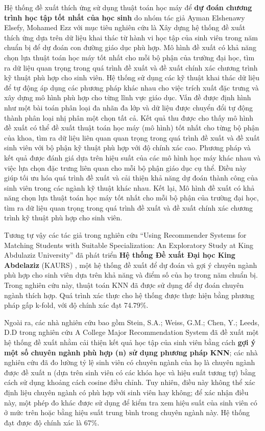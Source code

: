 Hệ thống đề xuất thích ứng sử dụng thuật toán học máy để \textbf{dự đoán chương trình học tập tốt nhất của học sinh} do nhóm tác giả Ayman Elshenawy Elsefy, Mohamed Ezz \cite{mohamed} với mục tiêu nghiên cứu là Xây dựng hệ thống đề xuất thích ứng dựa trên dữ liệu khai thác từ hành vi học tập của sinh viên trong năm chuẩn bị để dự đoán con đường giáo dục phù hợp. Mô hình đề xuất có khả năng chọn lựa thuật toán học máy tốt nhất cho mỗi bộ phận của trường đại học, tìm ra dữ liệu quan trọng trong quá trình đề xuất và đề xuất chính xác chương trình kỹ thuật phù hợp cho sinh viên. Hệ thống sử dụng các kỹ thuật khai thác dữ liệu để tự động áp dụng các phương pháp khác nhau cho việc trích xuất đặc trưng và xây dựng mô hình phù hợp cho từng lĩnh vực giáo dục. Vấn đề được định hình như một bài toán phân loại đa nhãn đa lớp và dữ liệu được chuyển đổi tự động thành phân loại nhị phân một chọn tất cả. Kết quả thu được cho thấy mô hình đề xuất có thể đề xuất thuật toán học máy (mô hình) tốt nhất cho từng bộ phận của khoa, tìm ra dữ liệu liên quan quan trọng trong quá trình đề xuất và đề xuất sinh viên với bộ phận kỹ thuật phù hợp với độ chính xác cao. Phương pháp và kết quả được đánh giá dựa trên hiệu suất của các mô hình học máy khác nhau và việc lựa chọn đặc trưng liên quan cho mỗi bộ phận giáo dục cụ thể. Điều này giúp tối ưu hóa quá trình đề xuất và cải thiện khả năng dự đoán thành công của sinh viên trong các ngành kỹ thuật khác nhau. Kết lại, Mô hình đề xuất có khả năng chọn lựa thuật toán học máy tốt nhất cho mỗi bộ phận của trường đại học, tìm ra dữ liệu quan trọng trong quá trình đề xuất và đề xuất chính xác chương trình kỹ thuật phù hợp cho sinh viên. 

Tương tự vậy các tác giả trong nghiên cứu ``Using Recommender Systems for Matching Students with Suitable Specialization: An Exploratory Study at King Abdulaziz University” đã phát triển \textbf{Hệ thống Đề xuất Đại học King Abdelaziz} (KAURS) \cite{khloud}, một hệ thống đề xuất để dự đoán và gợi ý chuyên ngành phù hợp cho sinh viên dựa trên khả năng và điểm số của họ trong năm chuẩn bị. Trong nghiên cứu này, thuật toán KNN đã được sử dụng để dự đoán chuyên ngành thích hợp. Quá trình xác thực cho hệ thống được thực hiện bằng phương pháp gấp k-fold, với độ chính xác đạt 74.79\%.

Ngoài ra, các nhà nghiên cứu bao gồm Stein, S.A.; Weiss, G.M.; Chen, Y.; Leeds, D.D trong nghiên cứu A College Major Recommendation System \cite{researchgate} đã đề xuất một hệ thống đề xuất nhằm cải thiện kết quả học tập của sinh viên bằng cách \textbf{gợi ý một số chuyên ngành phù hợp (n) sử dụng phương pháp KNN}; các nhà nghiên cứu đã đo lường tỷ lệ sinh viên có chuyên ngành của họ là chuyên ngành được đề xuất n (dựa trên sinh viên có các khóa học và hiệu suất tương tự) bằng cách sử dụng khoảng cách cosine điều chỉnh. Tuy nhiên, điều này không thể xác định liệu chuyên ngành có phù hợp với sinh viên hay không; để xác nhận điều này, một phép đo khác được sử dụng để kiểm tra xem hiệu suất của sinh viên có ở mức trên hoặc bằng hiệu suất trung bình trong chuyên ngành này. Hệ thống đạt được độ chính xác là 67\%.

